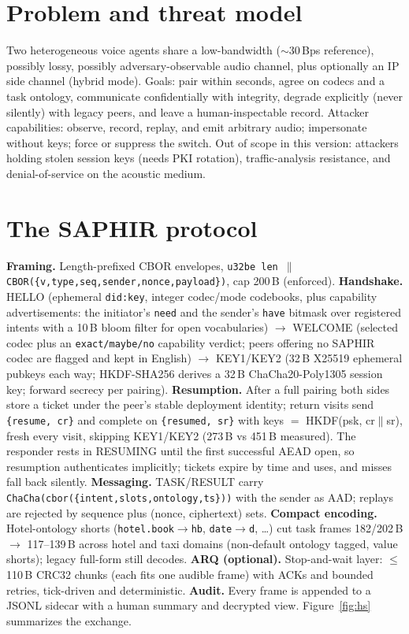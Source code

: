 \documentclass[11pt]{article}
\begin{document}
\section{Problem and threat model}
Two heterogeneous voice agents share a low-bandwidth ($\sim$30\,Bps reference),
possibly lossy, possibly adversary-observable audio channel, plus optionally an
IP side channel (hybrid mode). Goals: pair within seconds, agree on codecs and
a task ontology, communicate confidentially with integrity, degrade explicitly
(never silently) with legacy peers, and leave a human-inspectable record.
Attacker capabilities: observe, record, replay, and emit arbitrary audio;
impersonate without keys; force or suppress the switch. Out of scope in this
version: attackers holding stolen session keys (needs PKI rotation),
traffic-analysis resistance, and denial-of-service on the acoustic medium.

\section{The SAPHIR protocol}
\textbf{Framing.} Length-prefixed CBOR envelopes,
\texttt{u32be len $\parallel$ CBOR(\{v,type,seq,sender,nonce,payload\})}, cap
200\,B (enforced). \textbf{Handshake.} HELLO (ephemeral \texttt{did:key},
integer codec/mode codebooks, plus capability advertisements: the initiator's
\texttt{need} and the sender's \texttt{have} bitmask over registered intents
with a 10\,B bloom filter for open vocabularies) $\to$ WELCOME (selected codec
plus an \texttt{exact/maybe/no} capability verdict; peers offering no SAPHIR
codec are flagged and kept in English) $\to$ KEY1/KEY2 (32\,B X25519 ephemeral
pubkeys each way; HKDF-SHA256 derives a 32\,B ChaCha20-Poly1305 session key;
forward secrecy per pairing). \textbf{Resumption.} After a full pairing both
sides store a ticket under the peer's stable deployment identity; return
visits send \texttt{\{resume, cr\}} and complete on \texttt{\{resumed, sr\}}
with keys $=$ HKDF(psk, cr$\parallel$sr), fresh every visit, skipping KEY1/KEY2
(273\,B vs 451\,B measured). The responder rests in RESUMING until the first
successful AEAD open, so resumption authenticates implicitly; tickets expire by
time and uses, and misses fall back silently. \textbf{Messaging.} TASK/RESULT carry
\texttt{ChaCha(cbor(\{intent,slots,ontology,ts\}))} with the sender as AAD;
replays are rejected by sequence plus (nonce, ciphertext) sets.
\textbf{Compact encoding.} Hotel-ontology shorts (\texttt{hotel.book}$\to$\texttt{hb},
\texttt{date}$\to$\texttt{d}, \dots) cut task frames 182/202\,B $\to$ 117--139\,B
across hotel and taxi domains (non-default ontology tagged, value shorts);
legacy full-form still decodes. \textbf{ARQ (optional).} Stop-and-wait layer:
$\leq$110\,B CRC32 chunks (each fits one audible frame) with ACKs and bounded
retries, tick-driven and deterministic. \textbf{Audit.} Every frame is appended
to a JSONL sidecar with a human summary and decrypted view.
Figure~\ref{fig:hs} summarizes the exchange.
\end{document}
